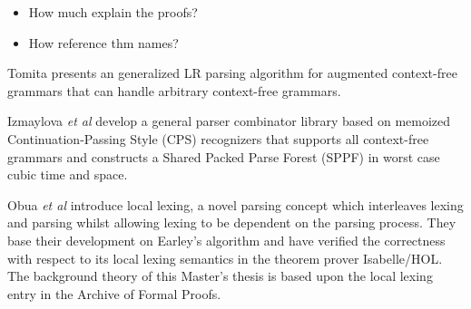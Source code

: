 %
\begin{isabellebody}%
%
%
\isadelimtheory
%
\endisadelimtheory
%
\isatagtheory
%
\endisatagtheory
{\isafoldtheory}%
%
\isadelimtheory
%
\endisadelimtheory
%
\isadelimdocument
%
\endisadelimdocument
%
\isatagdocument
%
\isamarkuptrue%
%
\endisatagdocument
{\isafolddocument}%
%
\isadelimdocument
%
\endisadelimdocument
%
\begin{isamarkuptext}%
\begin{itemize}
    \item How much explain the proofs? \\
    \item How reference thm names? \\
  \end{itemize}%
\end{isamarkuptext}\isamarkuptrue%
%
\isadelimdocument
%
\endisadelimdocument
%
\isatagdocument
%
\isamarkuptrue%
%
\isamarkuptrue%
%
\isamarkuptrue%
%
\isamarkuptrue%
%
\isamarkuptrue%
%
\isamarkuptrue%
%
\isamarkuptrue%
%
\endisatagdocument
{\isafolddocument}%
%
\isadelimdocument
%
\endisadelimdocument
%
\begin{isamarkuptext}%
Tomita \cite{Tomita:1987} presents an generalized LR parsing algorithm for augmented
context-free grammars that can handle arbitrary context-free grammars.

Izmaylova \textit{et al} \cite{Izmaylova:2016} develop a general parser 
combinator library based on memoized Continuation-Passing Style (CPS) recognizers that supports all
context-free grammars and constructs a Shared Packed Parse Forest (SPPF) in worst case cubic time and space.%
\end{isamarkuptext}\isamarkuptrue%
%
\isadelimdocument
%
\endisadelimdocument
%
\isatagdocument
%
\isamarkuptrue%
%
\endisatagdocument
{\isafolddocument}%
%
\isadelimdocument
%
\endisadelimdocument
%
\begin{isamarkuptext}%
Obua \textit{et al} \cite{Obua:2017} introduce local lexing, a novel parsing concept which interleaves
lexing and parsing whilst allowing lexing to be dependent on the parsing process. They base their
development on Earley's algorithm and have verified the correctness with respect to its local lexing
semantics in the theorem prover Isabelle/HOL. The background theory of this Master's thesis is based
upon the local lexing entry \cite{LocalLexing-AFP} in the Archive of Formal Proofs.


\end{isamarkuptext}
\end{isabellebody}
